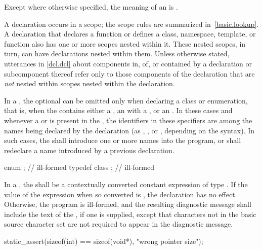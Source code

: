 \pnum
Except where otherwise specified, the meaning of an 
is .

\pnum
{}%
%
A declaration occurs in a scope; the scope rules are
summarized in~\ref{basic.lookup}. A declaration that declares a function
or defines a class, namespace, template, or function also has one or
more scopes nested within it. These nested scopes, in turn, can have
declarations nested within them. Unless otherwise stated, utterances in
\ref{dcl.dcl} about components in, of, or contained by a
declaration or subcomponent thereof refer only to those components of
the declaration that are \emph{not} nested within scopes nested within
the declaration.

\pnum
{}%
%
In a , the optional
 can be omitted only when declaring a
class or enumeration, that is,
when the  contains either a
, an  with
a , or an
. In these cases and whenever a
 or  is present in
the , the identifiers in these specifiers
are among the names being declared by the declaration (as
, , or
, depending on the syntax). In such cases,
the  shall introduce one or more names into
the program, or shall redeclare a name introduced by a previous
declaration.
\begin{example}
\begin{codeblock}
enum { };           // ill-formed
typedef class { };  // ill-formed
\end{codeblock}
\end{example}

\pnum
{}%
In a , the
 shall be
a contextually converted constant expression
of type .
If the value of the expression when
so converted is , the declaration has no
effect. Otherwise, the program is ill-formed, and the resulting
diagnostic message shall include the text of
the , if one is supplied,
except that characters not in the basic
source character set are not required to appear in
the diagnostic message.
\begin{example}
\begin{codeblock}
static_assert(sizeof(int) == sizeof(void*), "wrong pointer size");
\end{codeblock}
\end{example}


